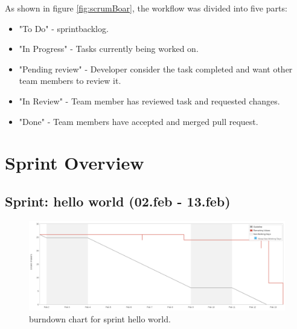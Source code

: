 As shown in figure \ref{fig:scrumBoar}, the workflow was divided into five parts:

\begin{itemize}
    \item "To Do" - \Gls{sprintbacklog}.
    \item "In Progress" - Tasks currently being worked on.
    \item "Pending review" - Developer consider the task completed and want other team members to review it.
    \item "In Review" - Team member has reviewed task and requested changes.
    \item "Done" - Team members have accepted and merged pull request.
\end{itemize}

\section{Sprint Overview}
\subsection{Sprint: hello world (02.feb - 13.feb)}
\begin{figure}[H] 
    \includegraphics[width=\textwidth]{inc/images/sprints/sprintHelloWorld020219-130219.png}
    \caption{\Gls{burndown} chart for \gls{sprint} hello world.}
    \label{fig:sprintHellWorld}
\end{figure}



